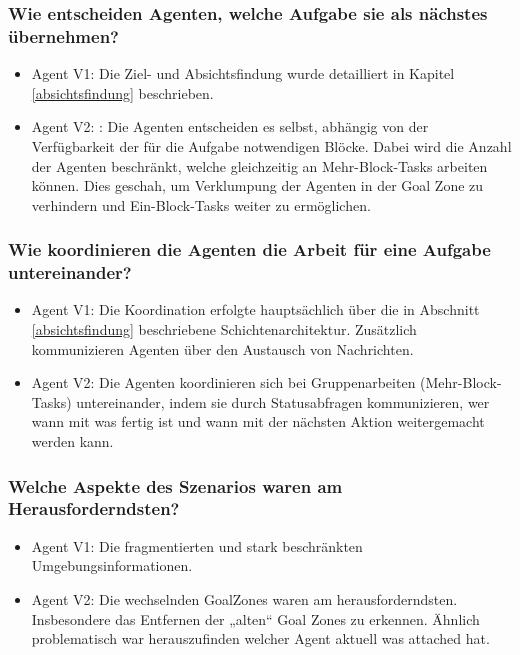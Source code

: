\documentclass[runningheads]{llncs}
\begin{document}
	\subsubsection{Wie entscheiden Agenten, welche Aufgabe sie als nächstes übernehmen?}
	\begin{itemize}
		\item Agent V1: Die Ziel- und Absichtsfindung wurde detailliert in Kapitel \ref{absichtsfindung} beschrieben.
		\item Agent V2: : Die Agenten entscheiden es selbst, abhängig von der Verfügbarkeit der für die Aufgabe notwendigen Blöcke. Dabei wird die Anzahl der Agenten beschränkt, welche gleichzeitig an Mehr-Block-Tasks arbeiten können. Dies geschah, um Verklumpung der Agenten in der Goal Zone zu verhindern und Ein-Block-Tasks weiter zu ermöglichen.
	\end{itemize}
	
	\subsubsection{Wie koordinieren die Agenten die Arbeit für eine Aufgabe untereinander?}
	\begin{itemize}
		\item Agent V1: Die Koordination erfolgte hauptsächlich über die in Abschnitt \ref{absichtsfindung} beschriebene Schichtenarchitektur. Zusätzlich kommunizieren Agenten über den Austausch von Nachrichten.
		\item Agent V2: Die Agenten koordinieren sich bei Gruppenarbeiten (Mehr-Block-Tasks) untereinander, indem sie durch Statusabfragen kommunizieren, wer wann mit was fertig ist und wann mit der nächsten Aktion weitergemacht werden kann. 
	\end{itemize}
	
	\subsubsection{Welche Aspekte des Szenarios waren am Herausforderndsten?}
	\begin{itemize}
		\item Agent V1: Die fragmentierten und stark beschränkten Umgebungsinformationen. 
		\item Agent V2: Die wechselnden GoalZones waren am herausforderndsten. Insbesondere das Entfernen der „alten“ Goal Zones zu erkennen. Ähnlich problematisch war herauszufinden welcher Agent aktuell was attached hat.
	\end{itemize}
	
\end{document}
